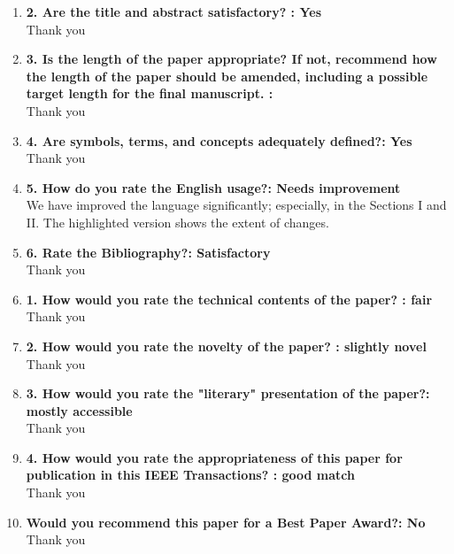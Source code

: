 \documentclass[11pt]{article}
\begin{document}
\begin{enumerate}
\item\textbf{2. Are the title and abstract satisfactory? : Yes}\\
Thank you

\item\textbf{3. Is the length of the paper appropriate? If not, recommend how the length of the paper should be amended, including a possible target length for the final manuscript. :}\\
Thank you


\item\textbf{4. Are symbols, terms, and concepts adequately defined?: Yes
}\\
Thank you

\item\textbf{5. How do you rate the English usage?: Needs improvement}\\
We have improved the language significantly; especially, in the Sections I and II. The highlighted version shows the extent of changes.

\item\textbf{6. Rate the Bibliography?: Satisfactory
}\\
Thank you
\item\textbf{1. How would you rate the technical contents of the paper? : fair}\\
Thank you
\item\textbf{2. How would you rate the novelty of the paper? : slightly novel}\\
Thank you

\item\textbf{3. How would you rate the "literary" presentation of the paper?: mostly accessible
}\\
Thank you
\item\textbf{4. How would you rate the appropriateness of this paper for publication in this IEEE Transactions? : good match}\\
Thank you

\item\textbf{Would you recommend this paper for a Best Paper Award?: No
}\\
Thank you

\end{enumerate}
\end{document}
